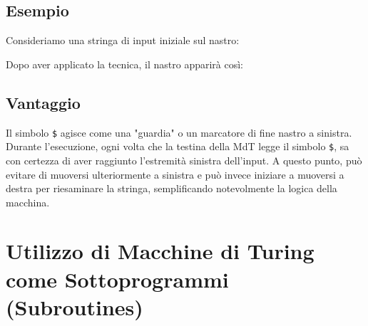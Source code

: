 \documentclass[a4paper]{article}
\theoremstyle{definition} %
\newcommand{\blankS}{\ensuremath{\raisebox{-0.15ex}{\scalebox{1.3}[0.7]{$\sqcup$}}}}
\begin{document}
\subsection{Esempio}
Consideriamo una stringa di input iniziale sul nastro:
\begin{center}
\end{center}
Dopo aver applicato la tecnica, il nastro apparirà così:
\begin{center}
\end{center}

\subsection{Vantaggio}
Il simbolo \texttt{\$} agisce come una "guardia" o un marcatore di fine nastro a sinistra. Durante l'esecuzione, ogni volta che la testina della MdT legge il simbolo \texttt{\$}, sa con certezza di aver raggiunto l'estremità sinistra dell'input. A questo punto, può evitare di muoversi ulteriormente a sinistra e può invece iniziare a muoversi a destra per riesaminare la stringa, semplificando notevolmente la logica della macchina.

\section{Utilizzo di Macchine di Turing come Sottoprogrammi (Subroutines)}
\end{document}
